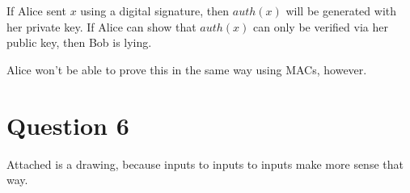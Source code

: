 \documentclass[a4paper,10pt]{article}
\begin{document}
If Alice sent $x$ using a digital signature, then $auth(x)$ will be generated with her private key. If Alice can show that $auth(x)$ can only be verified via her public key, then Bob is lying.

Alice won't be able to prove this in the same way using MACs, however.  

\section{Question 6}

Attached is a drawing, because inputs to inputs to inputs make more sense that way.
\end{document}
